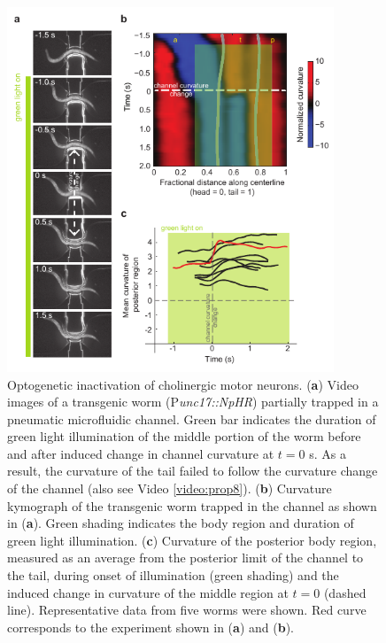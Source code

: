 \begin{figure} 
\includegraphics[width=0.87\textwidth]{figures/prop4}
\caption[ Optogenetic inactivation of cholinergic motor neurons.] { Optogenetic inactivation of cholinergic motor neurons.   
(\textbf{a}) Video images of a transgenic worm (P\textit{unc17::NpHR}) partially trapped in a pneumatic 
microfluidic channel. Green bar indicates the duration of green light illumination of the middle 
portion of the worm before and after induced change in channel curvature at $t = 0$ s. As a result, 
the curvature of the tail failed to follow the curvature change of the channel (also see 
Video  \ref{video:prop8}). 
(\textbf{b}) Curvature kymograph of the transgenic worm trapped in the channel as shown in (\textbf{a}). Green 
shading indicates the body region and duration of green light illumination. 
(\textbf{c}) Curvature of the posterior body region, measured as an average from the posterior limit of the 
channel to the tail, during onset of illumination (green shading) and the induced change in 
curvature of the middle region at $t = 0$ (dashed line). Representative data from five worms were 
shown. Red curve corresponds to the experiment shown in (\textbf{a}) and (\textbf{b}). 
\label{fig:prop4}}
\end{figure}

